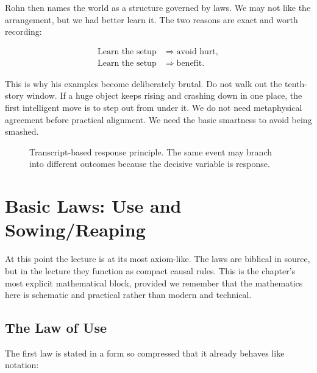Rohn then names the world as a structure governed by laws. We may not like the arrangement, but we had better learn it. The two reasons are exact and worth recording:

\begin{align}
\text{Learn the setup} &\Longrightarrow \text{avoid hurt},\\
\text{Learn the setup} &\Longrightarrow \text{benefit}.
\end{align}

This is why his examples become deliberately brutal. Do not walk out the tenth-story window. If a huge object keeps rising and crashing down in one place, the first intelligent move is to step out from under it. We do not need metaphysical agreement before practical alignment. We need the basic smartness to avoid being smashed.

\begin{figure}[t]
\centering
{}
\caption{Transcript-based response principle. The same event may branch into different outcomes because the decisive variable is response.}
\end{figure}

\section{Basic Laws: Use and Sowing/Reaping}

At this point the lecture is at its most axiom-like. The laws are biblical in source, but in the lecture they function as compact causal rules. This is the chapter's most explicit mathematical block, provided we remember that the mathematics here is schematic and practical rather than modern and technical.

\subsection{The Law of Use}

The first law is stated in a form so compressed that it already behaves like notation:

